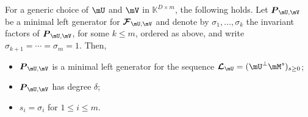 \documentclass[12pt]{article}
\newcommand{\mat}[1]{\bm{\MakeUppercase{#1}}} %
\newcommand{\seq}{\mat{\mathcal{F}}} %
\newcommand{\seqL}{\mat{\mathcal{L}}} %
\def\K{\mathbb{K}}
\def\K {\ensuremath{\mathbb{K}}}
\begin{document}
\begin{theorem}
  \label{randXY}
  For a generic choice of $\mU$ and $\mV$ in $\K^{D \times m}$, the
  following holds.  Let $\mat{P}_{\mU,\mV}$ be a minimal left
  generator for $\seq_{\mU,\mV}$ and denote by $\sigma_1, \dots,
  \sigma_k$ the invariant factors of $\mat{P}_{\mU,\mV}$, for some $k
  \le m$, ordered as above, and write $\sigma_{k+1}=\cdots=\sigma_m=1$.
  Then,
  \begin{itemize}
  \item $\mat{P}_{\mU,\mV}$ is a minimal left generator for the
    sequence $\seqL_{\mU} = (\mU^\perp \mM^s)_{s \ge 0}$;
  \item $\mat{P}_{\mU,\mV}$ has degree $\delta$;
  \item $s_i = \sigma_i$ for $1 \le i \le m$.
  \end{itemize}
\end{theorem}
\end{document}
